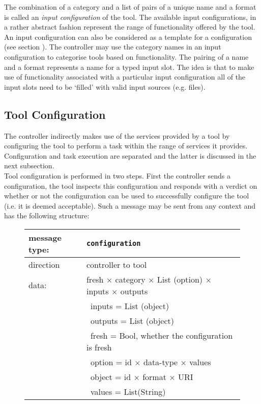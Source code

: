 \documentclass{article}
\newcommand{\msg}[1]{\texttt{#1}}
\begin{document}
   The combination of a category and a list of pairs of a unique name and a
   format is called an \textit{input configuration} of the tool.  The available
   input configurations, in a rather abstract fashion represent the range of
   functionality offered by the tool.  An input configuration can also be
   considered as a template for a configuration (see section
   ). The controller may use the category names
   in an input configuration to categorise tools based on functionality. The
   pairing of a name and a format represents a name for a typed input slot. The
   idea is that to make use of functionality associated with a particular input
   configuration all of the input slots need to be `filled' with valid input
   sources (e.g. files).

  \subsection{Tool Configuration} \label{ss::tool_configuration}

   The controller indirectly makes use of the services provided by a tool by
   configuring the tool to perform a task within the range of services it
   provides. Configuration and task execution are separated and the latter is
   discussed in the next subsection.
   \\[4pt]
   Tool configuration is performed in two steps. First the controller sends a
   configuration, the tool inspects this configuration and responds with a
   verdict on whether or not the configuration can be used to successfully
   configure the tool (i.e. it is deemed acceptable). Such a message may be
   sent from any context and has the following structure:
   
   \begin{figure}[H]
    \begin{center}
     \begin{tabular}{|ll|}
      \hline
       message type:   & \msg{configuration} \\
      \hline
       direction       & controller to tool \\
       data:           & fresh $\times$ category $\times$ List (option) $\times$ inputs $\times$ outputs \\
                       & \ inputs  = List (object) \\
                       & \ outputs = List (object) \\
                       & \ fresh   = Bool, whether the configuration is fresh \\
                       & \ option  = id $\times$ data-type $\times$ values \\
                       & \ object  = id $\times$ format $\times$ URI \\
                       & \ values  = List(String) \\
      \hline
     \end{tabular}
    \end{center}
   \end{figure}
\end{document}
